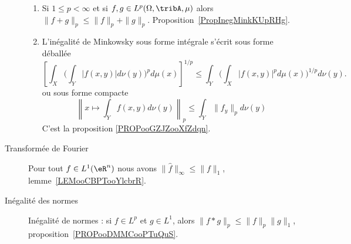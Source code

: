 \begin{description}
\begin{enumerate}
			\item
			      Si \( 1\leq p<\infty\) et si \( f,g\in L^p(\Omega,\tribA,\mu)\) alors \(  \| f+g \|_p\leq \| f \|_p+\| g \|_p\). Proposition~\ref{PropInegMinkKUpRHg}.
			\item
			      L'inégalité de Minkowsky sous forme intégrale s'écrit sous forme déballée
			      \begin{equation*}
				      \left[ \int_X\Big( \int_Y| f(x,y) |d\nu(y) \Big)^pd\mu(x) \right]^{1/p}\leq \int_Y\Big( \int_X| f(x,y) |^pd\mu(x) \Big)^{1/p}d\nu(y).
			      \end{equation*}
			      ou sous forme compacte
			      \begin{equation*}
				      \left\|   x\mapsto\int_Y f(x,y)d\nu(y)   \right\|_p\leq \int_Y  \| f_y \|_pd\nu(y)
			      \end{equation*}
			      C'est la proposition \ref{PROPooGZJZooXfZdqn}.
		\end{enumerate}
	\item[Transformée de Fourier]
		Pour tout \( f\in L^1(\eR^n)\) nous avons \( \| \hat f \|_{\infty}\leq \| f \|_1\), lemme~\ref{LEMooCBPTooYlcbrR}.
	\item[Inégalité des normes]
		Inégalité de normes : si \( f\in L^p\) et \( g\in L^1\), alors \( \| f*g \|_p\leq \| f \|_p\| g \|_1\), proposition~\ref{PROPooDMMCooPTuQuS}.

\end{description}
